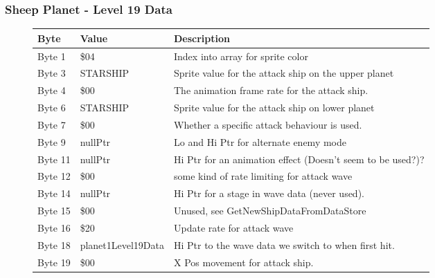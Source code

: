 \clearpage
\subsubsection{Sheep Planet - Level 19 Data}

\begin{figure}[H]
  {
  \setlength{\tabcolsep}{3.0pt}
  \setlength\cmidrulewidth{\heavyrulewidth} %
  \begin{adjustbox}{width=12cm}

\begin{tabular}{lll}
\toprule
 Byte    & Value              & Description                                                        \\
\midrule
 Byte 1  & \$04                & Index into array for sprite color                                  \\
 Byte 3  & STARSHIP           & Sprite value for the attack ship on the upper planet               \\
 Byte 4  & \$00                & The animation frame rate for the attack ship.                      \\
 Byte 6  & STARSHIP           & Sprite value for the attack ship on lower planet                   \\
 Byte 7  & \$00                & Whether a specific attack behaviour is used.                       \\
 Byte 9  & nullPtr            & Lo and Hi Ptr for alternate enemy mode                             \\
 Byte 11 & nullPtr            & Hi Ptr for an animation effect (Doesn't seem to be used?)?         \\
 Byte 12 & \$00                & some kind of rate limiting for attack wave                         \\
 Byte 14 & nullPtr            & Hi Ptr for a stage in wave data (never used).                      \\
 Byte 15 & \$00                & Unused, see GetNewShipDataFromDataStore                            \\
 Byte 16 & \$20                & Update rate for attack wave                                        \\
 Byte 18 & planet1Level19Data & Hi Ptr to the wave data we switch to when first hit.               \\
 Byte 19 & \$00                & X Pos movement for attack ship.                                    \\

\end{tabular}
\end{adjustbox}}
\end{figure}
